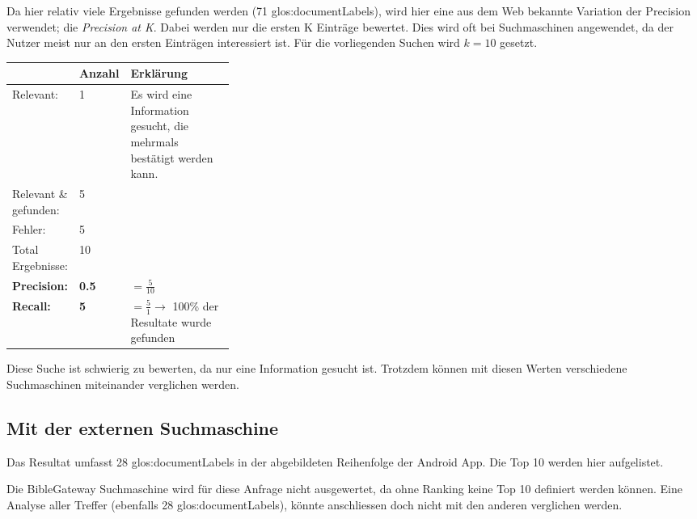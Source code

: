 Da hier relativ viele Ergebnisse gefunden werden (71 \glspl{glos:documentLabel}), wird hier eine aus dem Web bekannte Variation der Precision verwendet; die \textit{Precision at K}. Dabei werden nur die ersten K Einträge bewertet. Dies wird oft bei Suchmaschinen angewendet, da der Nutzer meist nur an den ersten Einträgen interessiert ist.
Für die vorliegenden Suchen wird $k = 10$ gesetzt.

\begin{table}[H]
	\centering
	\small\renewcommand{\arraystretch}{1.4}
	\begin{tabularx}{0.9\textwidth}{ L{0.22\linewidth} | L{0.1\linewidth} | X }%
		\hline
		& Anzahl & Erklärung \\ \hline \hline
		Relevant: & 1 & Es wird eine Information gesucht, die mehrmals bestätigt werden kann.\\
		Relevant \& gefunden: & 5 & \\
		Fehler: & 5 & \\
		Total Ergebnisse: & 10 & \\
		\hline
		\textbf{Precision:} & \textbf{0.5} & $= \frac{5}{10}$ \\
		\textbf{Recall:} & \textbf{5} & $= \frac{5}{1} \rightarrow$ 100\% der Resultate wurde gefunden\\
		\hline\hline
	\end{tabularx}
\end{table}

Diese Suche ist schwierig zu bewerten, da nur eine Information gesucht ist. Trotzdem können mit diesen Werten verschiedene Suchmaschinen miteinander verglichen werden.


\subsection{Mit der externen Suchmaschine}
Das Resultat umfasst 28 \glspl{glos:documentLabel} in der abgebildeten Reihenfolge der Android App.
Die Top 10 werden hier aufgelistet.

Die BibleGateway Suchmaschine wird für diese Anfrage nicht ausgewertet, da ohne Ranking keine Top 10 definiert werden können. Eine Analyse aller Treffer (ebenfalls 28 \glspl{glos:documentLabel}), könnte anschliessen doch nicht mit den anderen verglichen werden.

